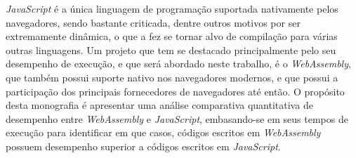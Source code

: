 \textit{JavaScript} é a única linguagem de programação suportada nativamente pelos
navegadores, sendo bastante criticada, dentre outros motivos por ser extremamente
dinâmica, o que a fez se tornar alvo de compilação para várias outras linguagens. Um
projeto que tem se destacado principalmente pelo seu desempenho de execução, e que será
abordado neste trabalho, é o \textit{WebAssembly}, que também possui suporte nativo nos
navegadores modernos, e que possui a participação dos principais fornecedores de
navegadores até então. O propósito desta monografia é apresentar uma análise comparativa
quantitativa de desempenho entre \textit{WebAssembly} e \textit{JavaScript}, embasando-se
em seus tempos de execução para identificar em que casos, códigos escritos em
\textit{WebAssembly} possuem desempenho superior a códigos escritos em
\textit{JavaScript}.

